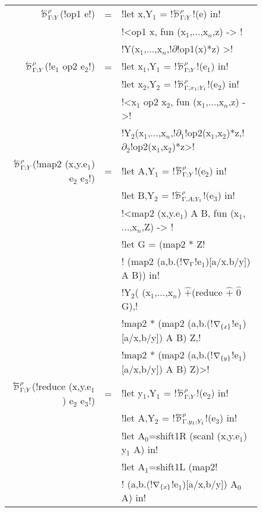 \begin{figure*}[t]
\begin{tabular}{|r c l|}
        $\directD{\rho}{\Gamma}{Y}$(!op1 e!) &=&  
            !let x,Y$_{1}$ = !$\directD{\rho}{\Gamma}{Y}$!(e) in! \\
            && !<op1 x, fun (x$_{1}$,$\ldots$,x$_n$,z) -> ! \\
            && !Y(x$_{1}$,$\ldots$,x$_n$,!$\partial$!op1(x)*z) >! \\
        $\directD{\rho}{\Gamma}{Y}$(!e$_{1}$ op2 e$_{2}$!) &=& 
            !let x$_{1}$,Y$_{1}$ = !$\directD{\rho}{\Gamma}{Y}$!(e$_{1}$) in! \\
            && !let x$_{2}$,Y$_{2}$ = !$\directD{\rho}{\Gamma,x_1}{Y_1}$!(e$_{2}$) in! \\
            && !<x$_{1}$ op2 x$_{2}$, fun (x$_{1}$,$\ldots$,x$_n$,z) ->! \\
            && !Y$_{2}$(x$_{1}$,$\ldots$,x$_n$,!$\partial_1$!op2(x$_{1}$,x$_{2}$)*z,!$\partial_2$!op2(x$_{1}$,x$_{2}$)*z>! \\
        $\directD{\rho}{\Gamma}{Y}$(!map2 (x,y.e$_{1}$) e$_{2}$ e$_{3}$!) &=&  
            !let A,Y$_{1}$ = !$\directD{\rho}{\Gamma}{Y}$!(e$_{2}$) in! \\
            && !let B,Y$_{2}$ = !$\directD{\rho}{\Gamma,A}{Y_1}$!(e$_{3}$) in! \\
            && !<map2 (x,y.e$_{1}$) A B, fun (x$_{1}$,$\ldots$,x$_n$,Z) -> !\\
            && !let G = (map2 * Z!\\
            && !  (map2 (a,b.(!$\nabla_\Gamma$!e$_{1}$)[a/x.b/y]) A B)) in! \\
            && !Y$_{2}$( (x$_{1}$,$\ldots$,x$_n$) $\widehat{+}$(reduce $\widehat{+}$ $\widehat{0}$ G),!\\
            && !map2 * (map2 (a,b.(!$\nabla_{\{x\}}$!e$_{1}$)[a/x,b/y]) A B) Z,!\\
            && !map2 * (map2 (a,b.(!$\nabla_{\{y\}}$!e$_{1}$)[a/x,b/y]) A B) Z)>!\\
        $\directD{\rho}{\Gamma}{Y}$(!reduce (x,y.e$_{1}$) e$_{2}$ e$_{3}$!) &=&
            !let y$_{1}$,Y$_{1}$ = !$\directD{\rho}{\Gamma}{Y}$!(e$_{2}$) in! \\
            && !let A,Y$_{2}$ = !$\directD{\rho}{\Gamma,y_1}{Y_1}$!(e$_{3}$) in! \\
            && !let A$_{0}$=shift1R (scanl (x,y.e$_{1}$) y$_{1}$ A) in! \\
            && !let A$_{1}$=shift1L (map2! \\
            && !   (a,b.(!$\nabla_{\{x\}}$!e$_{1}$)[a/x,b/y]) A$_{0}$ A) in! \\

\end{tabular}
\end{figure*}
